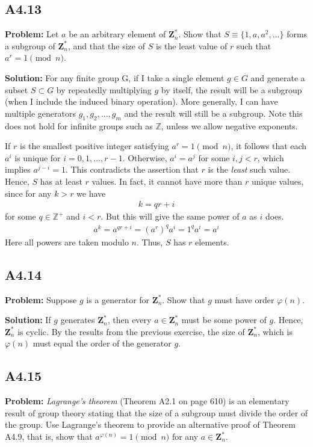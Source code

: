 \documentclass{article}
\begin{document}
\subsection*{A4.13}
\textbf{Problem:} Let $a$ be an arbitrary element of $\textbf{Z}_n^*$. Show that $S\equiv \{1,a,a^2,...\}$ forms a subgroup of $\textbf{Z}_n^*$, and that the size of $S$ is the least value of $r$ such that $a^r = 1\pmod{n}$.

\textbf{Solution:} For any finite group G, if I take a single element $g\in G$ and generate a subset $S \subset G$ by repeatedly multiplying $g$ by itself, the result will be a subgroup (when I include the induced binary operation). More generally, I can have multiple generators $g_1, g_2, ..., g_m$ and the result will still be a subgroup. Note this does not hold for infinite groups such as $\mathbb{Z}$, unless we allow negative exponents.

If $r$ is the smallest positive integer satisfying $a^r = 1\pmod{n}$, it follows that each $a^i$ is unique for $i=0,1,...,r-1$. Otherwise, $a^i = a^j$ for some $i,j <r$, which implies $a^{j-i}=1$. This contradicts the assertion that $r$ is the \emph{least} such value. Hence, $S$ has at least $r$ values. In fact, it cannot have more than $r$ unique values, since for any $k>r$ we have
\begin{align}
    k = qr + i
\end{align}
for some $q\in\mathbb{Z}^+$ and $i<r$. But this will give the same power of $a$ as $i$ does.
\begin{align}
    a^k = a^{qr + i} = (a^r)^q a^i = 1^q a^i = a^i
\end{align}
Here all powers are taken modulo $n$. Thus, $S$ has $r$ elements. 

\subsection*{A4.14}
\textbf{Problem:} Suppose $g$ is a generator for $\textbf{Z}_n^*$. Show that $g$ must have order $\varphi(n)$.

\textbf{Solution:} If $g$ generates $\textbf{Z}_n^*$, then every $a\in \textbf{Z}_n^*$ must be some power of $g$. Hence, $\textbf{Z}_n^*$ is cyclic. By the results from the previous exercise, the size of $\textbf{Z}_n^*$, which is $\varphi(n)$ must equal the order of the generator $g$.

\subsection*{A4.15}
\textbf{Problem:} \emph{Lagrange's theorem} (Theorem A2.1 on page 610) is an elementary result of group theory stating that the size of a subgroup must divide the order of the group. Use Lagrange's theorem to provide an alternative proof of Theorem A4.9, that is, show that $a^{\varphi(n)}=1\pmod{n}$ for any $a\in \textbf{Z}_n^*$.
\end{document}
